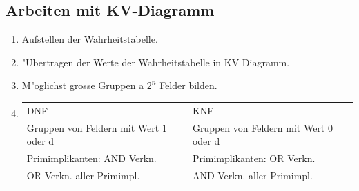 \subsection{Arbeiten mit KV-Diagramm}
\begin{enumerate}
\setlength{\itemsep}{1pt}
  \setlength{\parskip}{0pt}
  \setlength{\parsep}{0pt}
\item Aufstellen der Wahrheitstabelle.\\
\item "Ubertragen der Werte der Wahrheitstabelle in KV Diagramm.\\
\item M"oglichst grosse Gruppen a $2^n$ Felder bilden.\\
\item
\begin{tabular}{ll}
  DNF & KNF \\
  Gruppen von Feldern mit Wert 1 oder d & Gruppen von Feldern mit Wert 0 oder d\\
  Primimplikanten: AND Verkn. & Primimplikanten: OR Verkn.\\
  OR Verkn. aller Primimpl. & AND Verkn. aller Primimpl.\\
\end{tabular}
\end{enumerate}